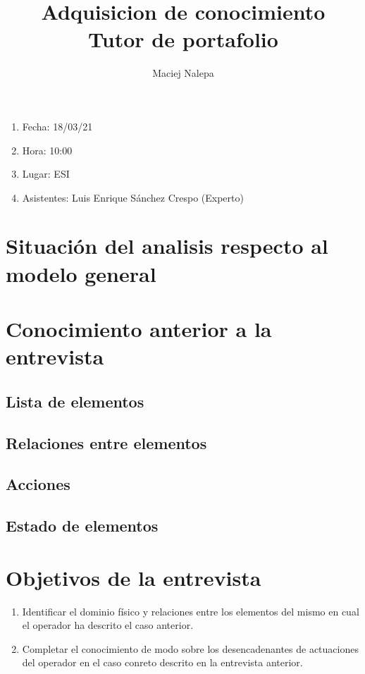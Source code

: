 \documentclass[a4paper,12pt]{article}
\title{Adquisicion de conocimiento\\ \normalsize{Tutor de portafolio}}
\author{Maciej Nalepa}
\begin{document}
\maketitle

\begin{enumerate}
	\item Fecha: 18/03/21
	\item Hora: 10:00
	\item Lugar: ESI
	\item Asistentes: Luis Enrique Sánchez Crespo (Experto)
\end{enumerate}

\section{Situación del analisis respecto al modelo general}

\section{Conocimiento anterior a la entrevista}

\subsection{Lista de elementos}
\subsection{Relaciones entre elementos}
\subsection{Acciones}
\subsection{Estado de elementos}

\section{Objetivos de la entrevista}
\begin{enumerate}
	\item Identificar el dominio físico y relaciones entre los elementos del mismo en cual el operador ha descrito el caso anterior.
	\item Completar el conocimiento de modo sobre los desencadenantes de actuaciones del operador en el caso conreto descrito en la entrevista anterior.
\end{enumerate}
\end{document}
